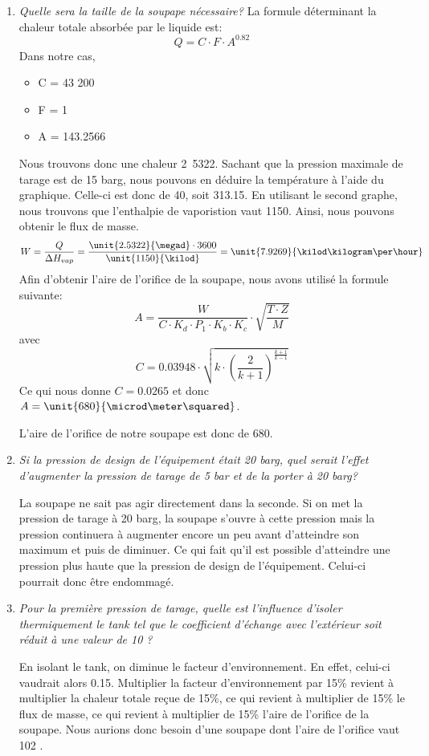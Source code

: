 \begin{enumerate}
\item\textit{Quelle sera la taille de la soupape nécessaire?}
La formule déterminant la chaleur totale absorbée par le liquide est: $$ Q = C \cdot F \cdot A^{0.82} $$
Dans notre cas,
\begin{itemize}
\item C = 43 200
\item F = 1
\item A = 143.2566 \meter\squared
\end{itemize}
Nous trouvons donc une chaleur \unit{2.5322}{\megad\watt}.
Sachant que la pression maximale de tarage est de 15 barg, nous pouvons en déduire la température à l'aide du graphique. Celle-ci est donc de 40\celsius, soit 313.15\kelvin. En utilisant le second graphe, nous trouvons que l'enthalpie de vaporistion vaut \unit{1150}{\kilo\joule\per\kilogram}. Ainsi, nous pouvons obtenir le flux de masse. $$ W = \frac{Q}{\Delta H_{vap}} = \frac{\unit{2.5322}{\megad} \cdot 3600}{\unit{1150}{\kilod}} = \unit{7.9269}{\kilod\kilogram\per\hour} $$
Afin d'obtenir l'aire de l'orifice de la soupape, nous avons utilisé la formule suivante:
$$ A = \frac{W}{C \cdot K_d \cdot P_1 \cdot K_b \cdot K_c}\cdot\sqrt{\frac{T \cdot Z}{M}} $$ avec $$ C = 0.03948\cdot\sqrt{k\cdot\left(\frac{2}{k+1}\right)^\frac{k+1}{k-1}} $$
Ce qui nous donne $ C = 0.0265$ et donc $A = \unit{680}{\microd\meter\squared}$.

L'aire de l'orifice de notre soupape est donc de \unit{680}{\microd\meter\squared}.

\item\textit{Si la pression de design de l'équipement était 20 barg, quel serait l'effet d'augmenter la pression de tarage de 5 bar et de la porter à 20 barg?}

La soupape ne sait pas agir directement dans la seconde. Si on met la pression de tarage à 20 barg, la soupape s'ouvre à cette pression mais la pression continuera à augmenter encore un peu avant d'atteindre son maximum et puis de diminuer. Ce qui fait qu'il est possible d'atteindre une pression plus haute que la pression de design de l'équipement. Celui-ci pourrait donc être endommagé.

\item\textit{Pour la première pression de tarage, quelle est l'influence d'isoler thermiquement le tank tel que le coefficient d'échange avec l'extérieur soit réduit à une valeur de 10 \watt\per\meter\squared\kelvin ?}

En isolant le tank, on diminue le facteur d'environnement. En effet, celui-ci vaudrait alors 0.15. Multiplier la facteur d'environnement par 15\% revient à multiplier la chaleur totale reçue de 15\%, ce qui revient à multiplier de 15\% le flux de masse, ce qui revient à multiplier de 15\% l'aire de l'orifice de la soupape. Nous aurions donc besoin d'une soupape dont l'aire de l'orifice vaut 102 \microd\meter\squared.
\end{enumerate}
